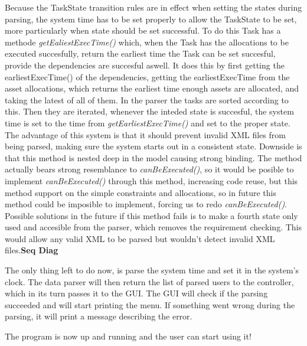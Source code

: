 			Because the TaskState transition rules are in effect when setting the states during parsing, the system time has to be set properly to allow the TaskState to be set, more particularly when state should be set successful. To do this Task has a methode \emph{getEaliestExecTime()} which, when the Task has the allocations to be executed succesfully, return the earliest time the Task can be set succesful, provide the dependencies are succesful aswell. It does this by first getting the earliestExecTime() of the dependencies, getting the earliestExecTime from the asset allocations, which returns the earliest time enough assets are allocated, and taking the latest of all of them. In the parser the tasks are sorted according to this. Then they are iterated, whenever the inteded state is succesful, the system time is set to the time from \emph{getEarliestExecTime()} and set to the proper state. The advantage of this system is that it should prevent invalid XML files from being parsed, making sure the system starts out in a consistent state. Downside  is that this method is nested deep in the model causing strong binding. The method actually bears strong resemblance to \emph{canBeExecuted()}, so it would be posible to implement \emph{canBeExecuted()} through this method, increasing code reuse, but this method support on the simple constraints and allocations, so in future this method could be imposible to implement, forcing us to redo \emph{canBeExecuted()}. Possible solutions in the future if this method fails is to make a fourth state only used and accesible from the parser, which removes the requirement checking. This would allow any valid XML to be parsed but wouldn't detect invalid XML files.\textbf{Seq Diag}
			
			The only thing left to do now, is parse the system time and set it in the system's clock. The data parser will then return the list of parsed users to the controller, which in its turn passes it to the GUI. The GUI will check if the parsing succeeded and will start printing the menu. If something went wrong during the parsing, it will print a message describing the error.
			
			The program is now up and running and the user can start using it!
			
